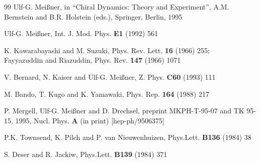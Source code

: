 \begin{thebibliography}{99}
 Ulf-G. Mei{\ss}ner, in
``Chiral Dynamics: Theory and Experiment'',  A.M. Bernstein and
B.R. Holstein (eds.), Springer, Berlin, 1995


 Ulf-G. Mei{\ss}ner, Int. J. Mod. Phys. {\bf E1}
  (1992) 561

 K. Kawarabayashi and M. Suzuki, Phys. Rev. Lett. {\bf
 16} (1966) 255; \\
Fayyazuddin and Riazuddin, Phys. Rev. {\bf 147} (1966) 1071


V. Bernard, N. Kaiser and Ulf-G. Mei\ss ner, Z. Phys. {\bf C60} (1993) 111

 M. Bando, T. Kugo and K. Yamawaki, Phys. Rep. {\bf 164}
  (1988) 217

 P. Mergell, Ulf-G. Mei{\ss}ner and D. Drechsel, preprint
MKPH-T-95-07 and TK 95-15, 1995, Nucl. Phys. {\bf A} (in print)
[hep-ph/9506375]

 P.K. Townsend, K. Pilch and P. van Nieuwenhuizen,
  Phys.Lett. {\bf B136} (1984) 38

 S. Deser and R. Jackiw,
  Phys.Lett. {\bf B139} (1984) 371


\end{thebibliography}






